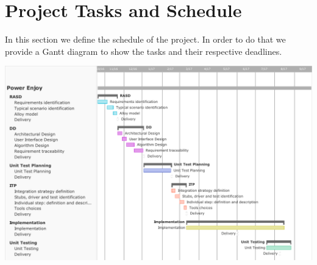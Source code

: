 \chapter{Project Tasks and Schedule}
In this section we define the schedule of the project.
In order to do that we provide a Gantt diagram to show the tasks and their respective deadlines.

\begin{minipage}{\textwidth}
\includegraphics[width=\linewidth-1cm, keepaspectratio]{../images/Gantt.pdf}
\end{minipage}
